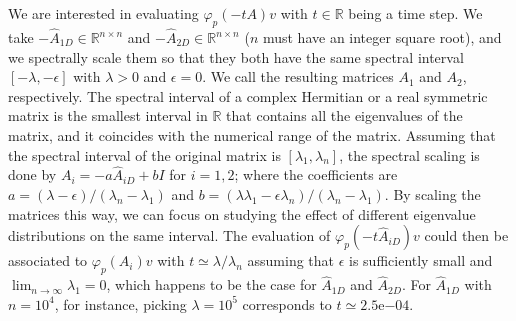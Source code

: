 We are interested in evaluating $\varphi_p(-tA) v$ with $t \in \mathbb{R}$ being a time step.
We take $-\hat{A}_{1D} \in \mathbb{R}^{n \times n}$ and $-\hat{A}_{2D} \in \mathbb{R}^{n \times n}$
($n$ must have an integer square root), and we spectrally scale them so that they both have the
same spectral interval $[-\lambda, -\epsilon]$ with $\lambda > 0$ and $\epsilon = 0$.
We call the resulting matrices $A_1$ and $A_2$, respectively.
The spectral interval of a complex Hermitian or a real symmetric matrix is the smallest
interval in $\mathbb{R}$ that contains all the eigenvalues of the matrix, and it coincides
with the numerical range of the matrix.
Assuming that the spectral interval of the original matrix is $[\lambda_1, \lambda_n]$,
the spectral scaling is done by $A_i = -a \hat{A}_{iD} + b I$ for $i = 1, 2$; where the coefficients
are $a = (\lambda - \epsilon) / (\lambda_n - \lambda_1)$ and
$b = (\lambda \lambda_1 - \epsilon \lambda_n) / (\lambda_n - \lambda_1)$.
By scaling the matrices this way, we can focus on studying the effect of different eigenvalue
distributions on the same interval. The evaluation of $\varphi_p(-t\hat{A}_{iD}) v$ could then be
associated to $\varphi_p(A_i) v$ with $t \simeq \lambda / \lambda_n$ assuming that $\epsilon$
is sufficiently small and $\lim_{n \to \infty}\lambda_1 = 0$,
which happens to be the case for $\hat{A}_{1D}$ and $\hat{A}_{2D}$. For $\hat{A}_{1D}$ with
$n = 10^4$, for instance, picking $\lambda = 10^5$ corresponds to $t \simeq 2.5\mathrm{e}{-04}$.


